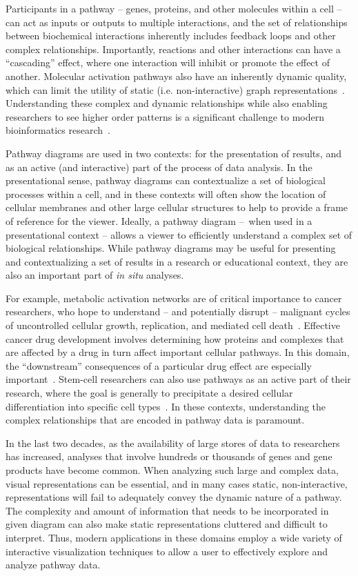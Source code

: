 \documentclass[twocolumn]{bmcart}%
\begin{document}
Participants in a pathway -- genes, proteins, and other molecules within a cell -- can act as inputs or outputs to multiple interactions, and the set of relationships between biochemical interactions inherently includes feedback loops and other complex relationships.
Importantly, reactions and other interactions can have a ``cascading'' effect, where one interaction will inhibit or promote the effect of another.
Molecular activation pathways also have an inherently dynamic quality, which can limit the utility of static (i.e. non-interactive) graph representations~\cite{kitano2002systems}.
Understanding these complex and dynamic relationships while also enabling researchers to see higher order patterns is a significant challenge to modern bioinformatics research~\cite{saraiya2005visualizing}.

Pathway diagrams are used in two contexts: for the presentation of results, and as an active (and interactive) part of the process of data analysis.
In the presentational sense, pathway diagrams can contextualize a set of biological processes within a cell, and in these contexts will often show the location of cellular membranes and other large cellular structures to help to provide a frame of reference for the viewer.
Ideally, a pathway diagram --~when used in a presentational context -- allows a viewer to efficiently understand a complex set of biological relationships.
While pathway diagrams may be useful for presenting and contextualizing a set of results in a research or educational context, they are also an important part of \emph{in situ} analyses.

For example, metabolic activation networks are of critical importance to cancer researchers, who hope to understand -- and potentially disrupt -- malignant cycles of uncontrolled cellular growth, replication, and mediated cell death~\cite{cairns2011regulation}.
Effective cancer drug development involves determining how proteins and complexes that are affected by a drug in turn affect important cellular pathways.
In this domain, the ``downstream'' consequences of a particular drug effect are especially important~\cite{luo2003targeting}.
Stem-cell researchers can also use pathways as an active part of their research, where the goal is generally to precipitate a desired cellular differentiation into specific cell types~\cite{reya2001stem}.
In these contexts, understanding the complex relationships that are encoded in pathway data is paramount.

In the last two decades, as the availability of large stores of data to researchers has increased, analyses that involve hundreds or thousands of genes and gene products have become common.
When analyzing such large and complex data, visual representations can be essential, and in many cases static, non-interactive, representations will fail to adequately convey the dynamic nature of a pathway.
The complexity and amount of information that needs to be incorporated in given diagram can also make static representations cluttered and difficult to interpret.
Thus, modern applications in these domains employ a wide variety of interactive visualization techniques to allow a user to effectively explore and analyze pathway data.
\end{document}
